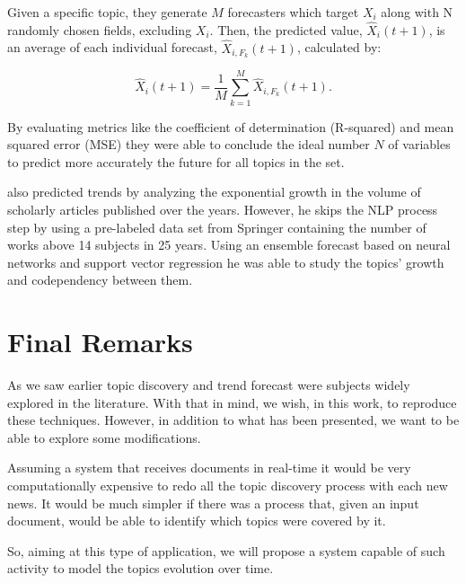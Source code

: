 Given a specific topic, they generate $M$ forecasters which target $X_{i}$ along with N randomly chosen fields, excluding $X_{i}$. Then, the predicted value, $\hat{X}_{i}(t+1)$, is an average of each individual forecast, $\hat{X}_{i, F_{k}}(t+1)$, calculated by:

\begin{equation}
	\hat{X}_{i}(t+1) = \dfrac{1}{M} \sum_{k=1}^{M}\hat{X}_{i, F_{k}}(t+1)\text{.}
\end{equation}

By evaluating metrics like the coefficient of determination (R-squared) and mean squared error (MSE) they were able to conclude the ideal number $N$ of variables to predict more accurately the future for all topics in the set.

 also predicted trends by analyzing the exponential growth in the volume of scholarly articles published over the years. However, he skips the NLP process step by using a pre-labeled data set from Springer containing the number of works above 14 subjects in 25 years. Using an ensemble forecast based on neural networks and support vector regression he was able to study the topics' growth and codependency between them.


\section{Final Remarks}

As we saw earlier topic discovery and trend forecast were subjects widely explored in the literature. With that in mind, we wish, in this work, to reproduce these techniques. However, in addition to what has been presented, we want to be able to explore some modifications.

Assuming a system that receives documents in real-time
it would be very computationally expensive to redo all the topic discovery process with each new news. It would be much simpler if there was a process that, given an input document, would be able to identify
which topics were covered by it.

So, aiming at this type of application, we will propose a system capable of such activity to model the topics evolution over time.


